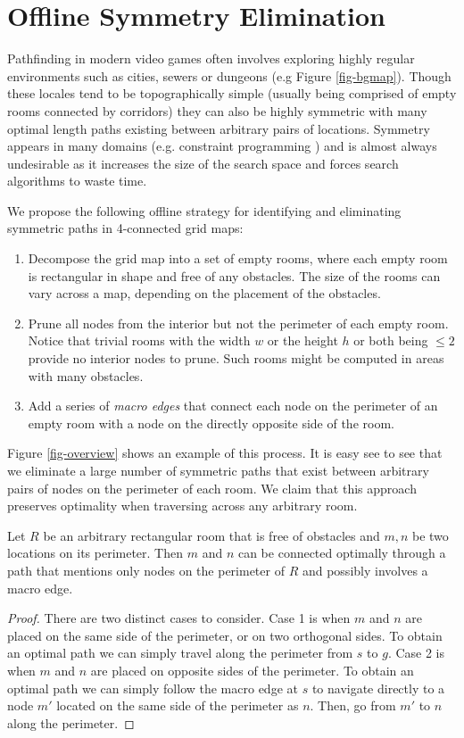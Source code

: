 \section{Offline Symmetry Elimination}
\label{algorithm}
Pathfinding in modern video games often involves exploring highly regular 
environments such as cities, sewers or dungeons (e.g Figure \ref{fig-bgmap}).
Though these locales tend to be topographically simple (usually being comprised
of empty rooms connected by corridors) they can also be highly symmetric 
with many optimal length paths existing between arbitrary pairs of locations.
Symmetry appears in many domains (e.g. constraint programming \cite{walsh07}) and is 
almost always undesirable as it increases the size of the search space
and forces search algorithms to waste time.
\par
We propose the following offline strategy for identifying and eliminating symmetric paths in 
4-connected grid maps:
\begin{enumerate}
\item{Decompose the grid map into a set of empty rooms, where each empty room is 
rectangular in shape and free of any obstacles. 
The size of the rooms can vary across a map, depending
on the placement of the obstacles.}
\item{Prune all nodes from the interior but not the perimeter of each empty room.
Notice that trivial rooms with the width $w$ or the height $h$ or both being $\leq 2$
provide no interior nodes to prune. Such rooms might be computed in areas with many obstacles.}
\item{Add a series of \emph{macro edges} that connect each node on the perimeter of an empty room
with a node on the directly opposite side of the room.}
\end{enumerate}
Figure \ref{fig-overview} shows an example of this process.
It is easy see to see that we eliminate a large number of symmetric paths
that exist between arbitrary pairs of nodes on the perimeter of each room.
We claim that this approach preserves optimality when traversing across any arbitrary room.

\begin{lemma}
\label{thm-roomtraversal}
Let $R$ be an arbitrary rectangular room that is free of obstacles
and $m, n$ be two locations on its perimeter.
Then $m$ and $n$ can be connected optimally through a path that
mentions only nodes on the perimeter of $R$ and possibly involves
a macro edge.
\end{lemma}
\begin{proof}
\par
There are two distinct cases to consider.
Case 1 is when $m$ and $n$ are placed on the same side of the perimeter, or
on two orthogonal sides. 
To obtain an optimal path we can simply travel along the perimeter from $s$ to $g$.
Case 2 is when $m$ and $n$ are placed on opposite sides of the perimeter.
To obtain an optimal path we can simply follow the macro edge at $s$ 
to navigate directly to a node $m'$ located on
the same side of the perimeter as $n$. Then, go from $m'$ to $n$ along the perimeter.
\end{proof}

